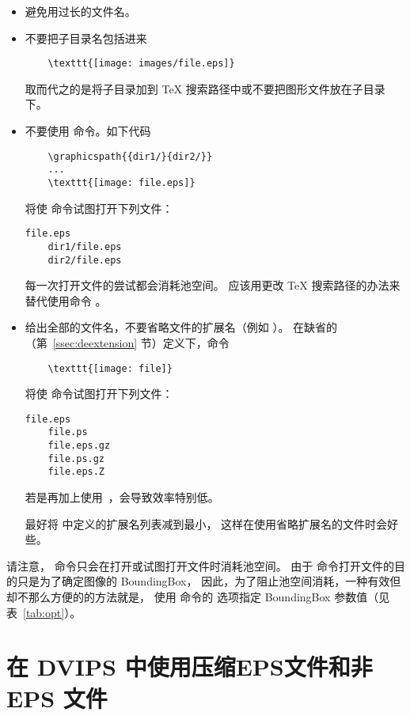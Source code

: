\begin{itemize}
\item 避免用过长的文件名。

\item 不要把子目录名包括进来
	\begin{lstlisting}
	\texttt{[image: images/file.eps]}
	\end{lstlisting}
	取而代之的是将子目录加到 \TeX{} 搜索路径中或不要把图形文件放在子目录下。
	
\item 不要使用  命令。如下代码
	\begin{lstlisting}
	\graphicspath{{dir1/}{dir2/}}
	...
	\texttt{[image: file.eps]}
	\end{lstlisting}
	将使  命令试图打开下列文件：
	\begin{Verbatim}[xleftmargin=1.5cm]
	file.eps
	dir1/file.eps
	dir2/file.eps
	\end{Verbatim}
	每一次打开文件的尝试都会消耗池空间。
	应该用更改 \TeX{} 搜索路径的办法来替代使用命令 。
	
\item 给出全部的文件名，不要省略文件的扩展名（例如 ）。
	在缺省的  （第~\ref{ssec:deextension} 节）定义下，命令
	\begin{lstlisting}
	\texttt{[image: file]}
	\end{lstlisting}
	将使  命令试图打开下列文件：
	\begin{Verbatim}[xleftmargin=1.5cm]
	file.eps
	file.ps
	file.eps.gz
	file.ps.gz
	file.eps.Z
	\end{Verbatim}
	若是再加上使用~，会导致效率特别低。
	
	最好将  中定义的扩展名列表减到最小，
	这样在使用省略扩展名的文件时会好些。
\end{itemize}

请注意， 命令只会在打开或试图打开文件时消耗池空间。
由于  命令打开文件的目的只是为了确定图像的 BoundingBox，
因此，为了阻止池空间消耗，一种有效但却不那么方便的的方法就是，
使用  命令的  选项指定 BoundingBox 参数值（见表~\ref{tab:opt}）。


\section{在 DVIPS 中使用压缩EPS文件和非 EPS 文件}\label{sec:dvips-noneps}

